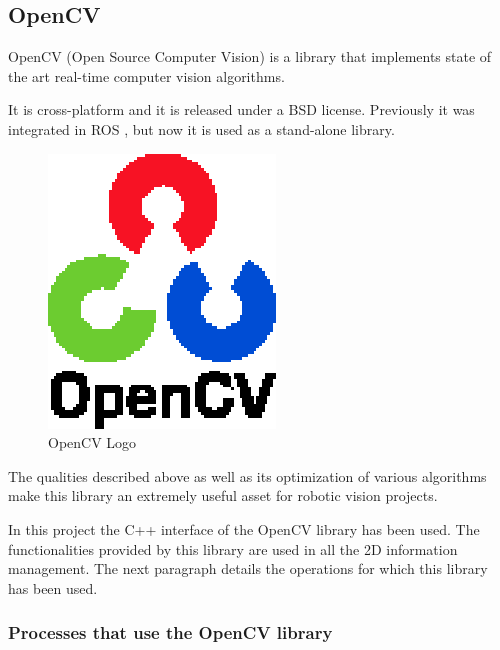 \newpage

\subsection{OpenCV}
\label{opencv}

OpenCV\cite{opencv} (Open Source Computer Vision) is a library that implements state of the art real-time computer vision 
algorithms. 

It is cross-platform and it is released under a BSD\cite{BSD} license. Previously it was integrated in ROS \cite{ros}, but
now it is used as a stand-alone library.  

\begin{figure}[h]
	\begin{center}
    \includegraphics[scale=1]{img/opencv/logo.eps}
	\caption[OpenCV Logo]{OpenCV Logo}
	\end{center}
\end{figure}

The qualities described above as well as its optimization of various algorithms make this library an extremely useful asset for robotic vision projects. 


In this project the C++ interface of the OpenCV library has been used. The functionalities provided by this library are used in all the 2D information management. The next paragraph details the operations for which this library has been used. 

\subsubsection{Processes that use the OpenCV library}

